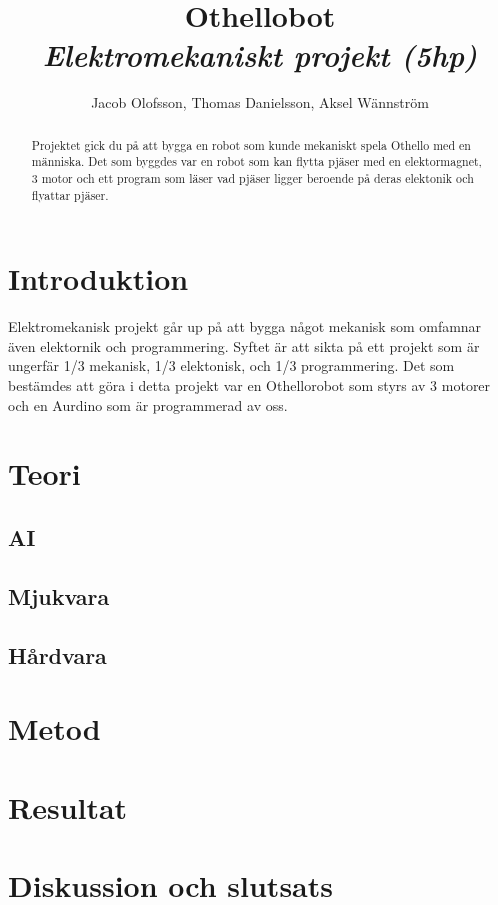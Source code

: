 \documentclass[a4paper]{article}
\begin{document}
\title{
	\textbf{Othellobot}\\
	\textit{Elektromekaniskt projekt (5hp)}
}
\author{Jacob Olofsson, Thomas Danielsson, Aksel Wännström}
\maketitle

\pagebreak

\begin{abstract}
Projektet gick du på att bygga en robot som kunde mekaniskt spela Othello med en människa. Det som byggdes var en robot som kan flytta pjäser med en elektormagnet, 3 motor och ett program som läser vad pjäser ligger beroende på deras elektonik och flyattar pjäser. 
\end{abstract}

\tableofcontents

\pagebreak
{}

\section{Introduktion}
Elektromekanisk projekt går up på att bygga något mekanisk som omfamnar även elektornik och programmering. Syftet är att sikta på ett projekt som är ungerfär 1/3 mekanisk, 1/3 elektonisk, och 1/3 programmering. Det som bestämdes att göra i detta projekt var en Othellorobot som styrs av 3 motorer och en Aurdino som är programmerad av oss.
\section{Teori}
\subsection{AI}
\subsection{Mjukvara}
\subsection{Hårdvara}
\section{Metod}
\section{Resultat}
\section{Diskussion och slutsats}
\end{document}
